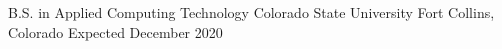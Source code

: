 



\begin{cventries}
  \cvnodesc
    {B.S. in Applied Computing Technology} %
    {Colorado State University} %
    {Fort Collins, Colorado} %
    {Expected December 2020} %
\end{cventries}
